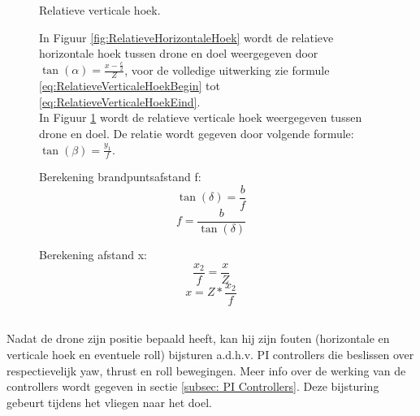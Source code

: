 \begin{figure}[h]
\begin{minipage}{.45\textwidth}
		\caption{Relatieve verticale hoek.}
		\label{fig:RelatieveVerticaleHoek}
	\end{minipage}%
	\caption*{In Figuur \ref{fig:RelatieveHorizontaleHoek} wordt de relatieve horizontale hoek tussen drone en doel weergegeven door \(\tan(\alpha) = \frac{x-\frac{c}{2}}{Z}\), voor de volledige uitwerking zie formule \ref{eq:RelatieveVerticaleHoekBegin} tot \ref{eq:RelatieveVerticaleHoekEind}.\\
		In Figuur \ref{fig:RelatieveVerticaleHoek} wordt de relatieve verticale hoek weergegeven tussen drone en doel. De relatie wordt gegeven door volgende formule: \(\tan(\beta) = \frac{y_1}{f}\).}
\end{figure}
\begin{figure}[h]
	\centering
	\begin{minipage}{.5\textwidth}
		Berekening brandpuntsafstand f:
		\begin{equation} \label{eq:RelatieveVerticaleHoekBegin}
		\tan(\delta) = \frac{b}{f}
		\end{equation}
		\begin{equation} 
		f = \frac{b}{\tan(\delta)}
		\end{equation}
	\end{minipage}
	\begin{minipage}{.45\textwidth}
		Berekening afstand x:
		\begin{equation} 
		\frac{x_2}{f} = \frac{x}{Z}
		\end{equation}
		\begin{equation} \label{eq:RelatieveVerticaleHoekEind}
		x = Z * \frac{x_2}{f}	
		\end{equation}
	\end{minipage}%
\end{figure}
\\
Nadat de drone zijn positie bepaald heeft, kan hij zijn fouten (horizontale en verticale hoek en eventuele roll) bijsturen a.d.h.v. PI controllers die beslissen over respectievelijk yaw, thrust en roll bewegingen. Meer info over de werking van de controllers wordt gegeven in sectie \ref{subsec: PI Controllers}. Deze bijsturing gebeurt tijdens het vliegen naar het doel. 
\\
\\
